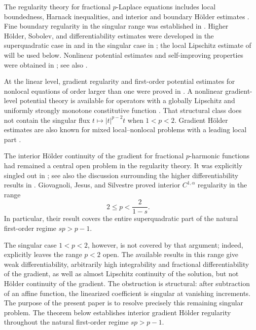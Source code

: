 \documentclass[11pt,reqno]{amsart}
\numberwithin{equation}{section}
\theoremstyle{remark}
\begin{document}
The regularity theory for fractional \(p\)-Laplace equations includes
local boundedness, Harnack inequalities, and interior and boundary
H\"older estimates
\cite{DiCastroKuusiPalatucci,DiCastroKuusiPalatucciHarnack,
IannizzottoMosconiSquassina,LindgrenViscosity}.  Fine boundary regularity
in the singular range was established in \cite{IannizzottoMosconi}.
Higher H\"older, Sobolev, and differentiability estimates were developed
in the superquadratic case in
\cite{BrascoLindgren,BrascoLindgrenSchikorra,
BoegeleinDuzaarLiaoMolicaBisciServadeiJFA,DieningNowak} and in the
singular case in \cite{GarainLindgren,DieningKimLeeNowak,
BoegeleinDuzaarLiaoMolicaBisciServadei}; the local Lipschitz estimate of
\cite{BiswasTopp} will be used below.  Nonlinear potential
estimates and self-improving properties were obtained in
\cite{KuusiMingioneSireMeasure,KuusiMingioneSireSelf}; see also
\cite{KuusiMingioneSireSurvey}.

At the linear level, gradient regularity and first-order potential
estimates for nonlocal equations of order larger than one were proved in
\cite{KuusiNowakSire}.  A nonlinear gradient-level potential theory is
available for operators with a globally Lipschitz and uniformly strongly
monotone constitutive function \cite{DieningKimLeeNowakGradient}.  That
structural class does not contain the singular flux
\(t\mapsto |t|^{p-2}t\) when \(1<p<2\).  Gradient H\"older estimates are
also known for mixed local--nonlocal problems with a leading local part
\cite{DeFilippisMingione}.

The interior H\"older continuity of the gradient for fractional
\(p\)-harmonic functions had remained a central open problem in the
regularity theory.  It was explicitly singled out in
\cite{BoegeleinDuzaarLiaoMolicaBisciServadeiHigher,
DieningKimLeeNowak,DieningNowak}; see also the discussion surrounding the
higher differentiability results in
\cite{BoegeleinDuzaarLiaoMolicaBisciServadei}.  Giovagnoli, Jesus, and
Silvestre \cite{GJS} proved interior \(C^{1,\alpha}\)
regularity in the range
\[
 2\le p<\frac{2}{1-s}.
\]
In particular, their result covers the entire
superquadratic part of the natural first-order regime \(sp>p-1\).

The singular case \(1<p<2\), however, is not covered by that argument;
indeed, \cite[p.~3]{GJS} explicitly leaves the range \(p<2\) open.
The available results in this range give weak differentiability,
arbitrarily high integrability and fractional differentiability of the
gradient, as well as almost Lipschitz continuity of the solution, but not H\"older
continuity of the gradient.  The obstruction is structural: after
subtraction of an affine function, the linearized coefficient is
singular at vanishing increments.  The purpose of the present paper is
to resolve precisely this remaining singular problem.  The theorem
below establishes interior gradient H\"older regularity throughout the
natural first-order regime \(sp>p-1\).
\end{document}
